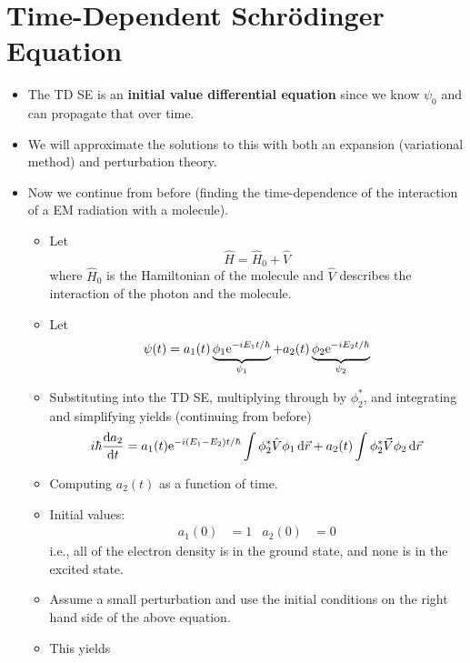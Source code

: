 \documentclass[../notes.tex]{subfiles}
\begin{document}
\section{Time-Dependent Schr\"{o}dinger Equation}
\begin{itemize}
    \item {}The TD SE is an \textbf{initial value differential equation} since we know $\psi_0$ and can propagate that over time.
    \item We will approximate the solutions to this with both an expansion (variational method) and perturbation theory.
    \item Now we continue from before (finding the time-dependence of the interaction of a EM radiation with a molecule).
    \begin{itemize}
        \item Let
        \begin{equation*}
            \hat{H} = \hat{H}_0+\hat{V}
        \end{equation*}
        where $\hat{H}_0$ is the Hamiltonian of the molecule and $\hat{V}$ describes the interaction of the photon and the molecule.
        \item Let
        \begin{equation*}
            \psi(t) = a_1(t)\underbrace{\phi_1\e[-iE_1t/\hbar]}_{\psi_1}+a_2(t)\underbrace{\phi_2\e[-iE_2t/\hbar]}_{\psi_2}
        \end{equation*}
        \item Substituting into the TD SE, multiplying through by $\phi_2^*$, and integrating and simplifying yields (continuing from before)
        \begin{equation*}
            i\hbar\dv{a_2}{t} = a_1(t)\e[-i(E_1-E_2)t/\hbar]\int\phi_2^*\hat{V}\phi_1\dd{\vec{r}}+a_2(t)\int\phi_2^*\vec{V}\phi_2\dd{\vec{r}}
        \end{equation*}
        \item Computing $a_2(t)$ as a function of time.
        \item Initial values:
        \begin{align*}
            a_1(0) &= 1&
            a_2(0) &= 0
        \end{align*}
        i.e., all of the electron density is in the ground state, and none is in the excited state.
        \item Assume a small perturbation and use the initial conditions on the right hand side of the above equation.
        \item This yields

\end{itemize}
\end{itemize}
\end{document}
